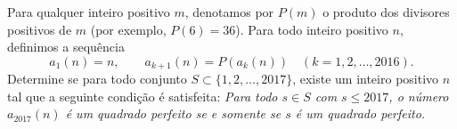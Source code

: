 Para qualquer inteiro positivo \(m\), denotamos por \(P(m)\) o produto dos divisores positivos de \(m\) (por exemplo, \(P(6)=36\)). Para todo inteiro positivo \(n\), definimos a sequência
\[a_1(n)=n,\qquad a_{k+1}(n)=P(a_k(n))\quad (k=1,2,\dots,2016).\]
Determine se para todo conjunto \(S\subset\{1,2,\dots,2017\}\), existe um inteiro positivo \(n\) tal que a seguinte condição é satisfeita:
\textit{Para todo \(s\in S\) com \(s\leq 2017\), o número \(a_{2017}(n)\) é um quadrado perfeito se e somente se \(s\) é um quadrado perfeito.}
